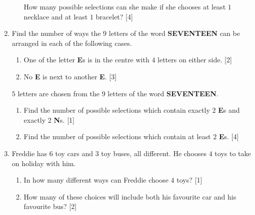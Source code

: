 \documentclass[a4paper]{article}
\begin{document}
\begin{enumerate}
\begin{enumerate}[label=(\roman*)]
		How many possible selections can she make if she chooses at least $1$ necklace and at least $1$ 	bracelet?  \hfill [4]
		\vspace{4cm}
	\end{enumerate}
	
	
	
	\item Find the number of ways the $9$ letters of the word \textbf{SEVENTEEN} can be arranged in each of the following cases.
	
	\begin{enumerate}[label=(\roman*)]
		\item One of the letter \textbf{E}s is in the centre with $4$ letters on either side. \hfill[2]
		\vspace{2cm}
		\item No \textbf{E} is next to another \textbf{E}. \hfill[3]
		\vspace{2cm}
	\end{enumerate}
	$5$ letters are chosen from the $9$ letters of the word \textbf{SEVENTEEN}.
	\begin{enumerate}[resume,label=(\roman*)]
		\item Find the number of possible selections which contain exactly $2$ \textbf{E}s and exactly 2 \textbf{N}s. \hfill[1]
		\vspace{2cm}
		\item Find the number of possible selections which contain at least $2$ \textbf{E}s. \hfill[4]
		\vspace{2cm}
	\end{enumerate}
	
	
	\item  Freddie has $6$ toy cars and $3$ toy buses, all different. He chooses $4$ toys to take on holiday with him.
	
	\begin{enumerate}[label=(\roman*)]
		\item In how many different ways can Freddie choose $4$ toys? \hfill[1]
		\vspace{2cm}
		\item How many of these choices will include both his favourite car and his favourite bus? \hfill[2]
		\vspace{2cm}
	\end{enumerate}
	

\end{enumerate}
\end{document}
